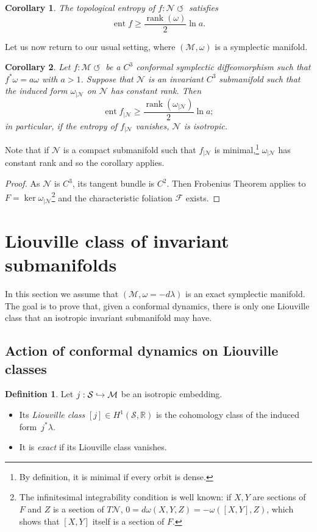 \documentclass[11pt]{article}
\newcommand{\Subsection}{\subsection}
\numberwithin{equation}{section}
\numberwithin{figure}{section}
\numberwithin{table}{section}
\def\hto{\mathrel{\lhook\joinrel\to}}
\providecommand{\righttoleftarrow}{\mathrel{\circlearrowleft}}
\newtheorem{corollary}{Corollary}
\theoremstyle{definition}
\newtheorem{definition}[theorem]{Definition}
\def\R{\mathbb{R}}
\def\cF{{\mathcal F}}
\def\cM{{\mathcal M}}
\def\cN{{\mathcal N}}
\def\cS{{\mathcal S}}
\DeclareMathOperator{\ent}{ent}
\DeclareMathOperator\rank{rank}
\begin{document}
\begin{corollary}
\label{cor:ent}
The topological entropy of $f : \cN \righttoleftarrow$ satisfies
\[
\ent f \geq \frac{\rank (\omega)}{2} \ln a.
\]
\end{corollary}

Let us now return to our usual setting, where $(\cM,\omega)$ is a symplectic manifold.

\begin{corollary}\label{CCisoento}
Let $f:\cM\righttoleftarrow$ be a $C^3$ conformal symplectic diffeomorphism such that $f^*\omega=a\omega$ with $a>1$. Suppose that $\cN$ is an invariant $C^3$ submanifold such that the induced form $\omega_{\vert \cN}$ on $\cN$ has constant rank. Then
\[
\ent f_{\vert\cN} \geq \frac{\rank (\omega_{\vert \cN})}{2} \ln a;
\]
in particular, if the entropy of $f_{|\cN}$ vanishes, $\cN$ is isotropic.
\end{corollary}

Note that if $\cN$ is a compact submanifold such that $f_{|\cN}$ is minimal,\footnote{By definition, it is minimal if every orbit is dense.} $\omega_{|\cN}$ has constant rank and so the corollary applies.

\begin{proof}
As $\cN$ is $C^3$, its tangent bundle is $C^2$. Then Frobenius Theorem applies to $F = \ker \omega_{\vert \cN}$\footnote{The infinitesimal integrability condition is well known: if $X,Y$ are sections of $F$ and $Z$ is a section of $T\cN$, $0 = d\omega(X,Y,Z) = - \omega([X,Y],Z)$, which shows that $[X,Y]$ itself is a section of $F$.} and the characteristic foliation $\cF$ exists.
\end{proof}

\section{Liouville class of invariant submanifolds}
\label{SLiouville}
\label{sec:exactnessdiff}

In this section we assume that $(\cM,\omega={ -d\lambda})$ is an exact symplectic manifold. The goal is to prove that, given a conformal dynamics, there is only one Liouville class that an isotropic invariant submanifold may have.

\Subsection{Action of conformal dynamics on Liouville classes}

\begin{definition}
Let $j : \cS \hto \cM$ be an isotropic embedding.
\begin{itemize}
\item
Its \emph{Liouville class} $[j] \in H^1(\cS,\R)$ is the cohomology class of the induced form~$j^*\lambda$.

\item
It is \emph{exact} if its Liouville class vanishes.
\end{itemize}
\end{definition}
\end{document}
